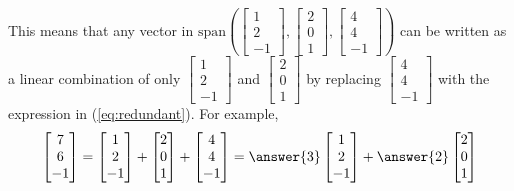 \documentclass{ximera}
\begin{document}
\begin{exploration}
 This means that any vector in $\mbox{span}\left(\begin{bmatrix}1\\2\\-1\end{bmatrix},\begin{bmatrix}2\\0\\1\end{bmatrix},\begin{bmatrix}4\\4\\-1\end{bmatrix}\right)$ can be written as a linear combination of only $\begin{bmatrix}1\\2\\-1\end{bmatrix}$ and $\begin{bmatrix}2\\0\\1\end{bmatrix}$ by replacing $\begin{bmatrix}4\\4\\-1\end{bmatrix}$ with the expression in (\ref{eq:redundant}). For example, $$\begin{bmatrix}7\\6\\-1\end{bmatrix}=\begin{bmatrix}1\\2\\-1\end{bmatrix}+\begin{bmatrix}2\\0\\1\end{bmatrix}+\begin{bmatrix}4\\4\\-1\end{bmatrix}=\answer{3}\begin{bmatrix}1\\2\\-1\end{bmatrix}+\answer{2}\begin{bmatrix}2\\0\\1\end{bmatrix}$$


\end{exploration}
\end{document}
